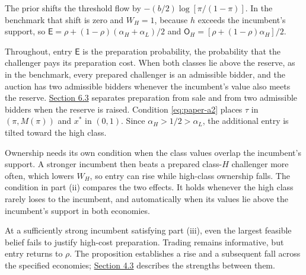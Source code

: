 The prior shifts the threshold flow by \(-(b/2)\log[\pi/(1-\pi)]\). In
the benchmark that shift is zero and \(W_H=1\), because \(h\) exceeds
the incumbent's support, so
\(\mathsf E=\rho+(1-\rho)(\alpha_H+\alpha_L)/2\) and
\(\mathsf O_H=[\rho+(1-\rho)\alpha_H]/2\).

Throughout, entry \(\mathsf E\) is the preparation probability, the
probability that the challenger pays its preparation cost. When both
classes lie above the reserve, as in the benchmark, every prepared
challenger is an admissible bidder, and the auction has two admissible
bidders whenever the incumbent's value also meets the reserve.
\hyperref[sec-design]{Section 6.3} separates preparation from sale and
from two admissible bidders when the reserve is raised. Condition
\eqref{eq:paper-a2} places \(\tau\) in \((\pi,M(\pi))\) and \(x^*\) in
\((0,1)\). Since \(\alpha_H>1/2>\alpha_L\), the additional entry is
tilted toward the high class.

Ownership needs its own condition when the class values overlap the
incumbent's support. A stronger incumbent then beats a prepared
class-\(H\) challenger more often, which lowers \(W_H\), so entry can
rise while high-class ownership falls. The condition in part (ii)
compares the two effects. It holds whenever the high class rarely loses
to the incumbent, and automatically when its values lie above the
incumbent's support in both economies.

At a sufficiently strong incumbent satisfying part (iii), even the
largest feasible belief fails to justify high-cost preparation. Trading
remains informative, but entry returns to \(\rho\). The proposition establishes a rise and a subsequent fall across the specified economies; \hyperref[sec-coexistence-and-the-equilibrium-correspondence]{Section 4.3} describes the strengths between them.
